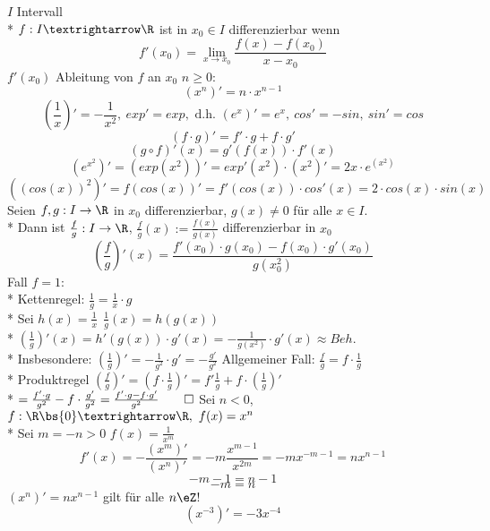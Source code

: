 %
\wdh
$I$ Intervall\\*
$f:I→\R$ ist in $x_0\in I$ differenzierbar wenn $$f'(x_0)=\lim_{x→x_0}\frac{f(x)-f(x_0)}{x-x_0}$$
$f'(x_0)$ Ableitung von $f$ an $x_0$
\bsp
$n\geq 0:$ $$(x^n)'=n·x^{n-1}$$
$$(\frac{1}{x})'=-\frac{1}{x^2},\ exp'=exp,\text{ d.h. }(e^x)'=e^x,\ cos'=-sin,\ sin'=cos$$
$$(f·g)'=f'·g+f·g'$$
$$(g\circ f)'(x)=g'(f(x))·f'(x)$$
\bsp
$$(e^{x^2})'=(exp(x^2))'=exp'(x^2)·(x^2)'=2x·e^(x^2)$$
$((cos (x))^2)' = f(cos (x))' = f'(cos (x)) \cdot cos'(x) = 2 \cdot cos(x) \cdot sin(x)$
Seien $f, g: I \to \R$ in $x_0$ differenzierbar, $g(x) \neq 0$ für alle $x \in I$.\\*
Dann ist $\frac{f}{g}: I \to \R$, $\frac{f}{g}(x) := \frac{f(x)}{g(x)}$ differenzierbar in $x_0$
$$(\frac{f}{g})'(x) = \frac{f'(x_0)\cdot g(x_0) - f(x_0) \cdot g'(x_0)}{g(x_0^2)}$$
\bew
Fall $f = 1$:\\*
Kettenregel:
$\frac{1}{g} = \frac{1}{x} \cdot g$\\*
Sei $h(x) = \frac{1}{x}\ \ \frac{1}{g}(x) = h(g(x))$ \\*
$(\frac{1}{g})'(x) = h'(g(x)) \cdot g'(x) = - \frac{1}{g(x^2)} \cdot g'(x) \approx Beh.$\\*
Insbesondere: $(\frac{1}{g})' = -\frac{1}{g^2} \cdot g' = -\frac{g'}{g^2}$
Allgemeiner Fall:
$\frac{f}{g} = f \cdot \frac{1}{g}$\\*
Produktregel \Rarr{} $(\frac{f}{g})' = (f \cdot \frac{1}{g})' = f'\frac{1}{g} + f \cdot (\frac{1}{g})'$\\*
$= \frac{f' \cdot g}{g^2} - f\cdot \frac{g'}{g^2} = \frac{f'\cdot g - f \cdot g'}{g^2} \qed$
\bsp
Sei $n<0$, $f:\R\bs\{0\}→\R,\ f(x)=x^n$\\*
Sei $m=-n>0$ $f(x)=\frac{1}{x^m}$
$$f'(x)=-\frac{(x^m)'}{(x^n)'}=-m\frac{x^{m-1}}{x^{2m}}=-mx^{-m-1}=nx^{n-1}$$
$$-m-1=n-1$$ $$-m=n$$
$(x^n)'=nx^{n-1}$ gilt für alle $n\eZ$!
$$(x^{-3})'=-3x^{-4}$$

